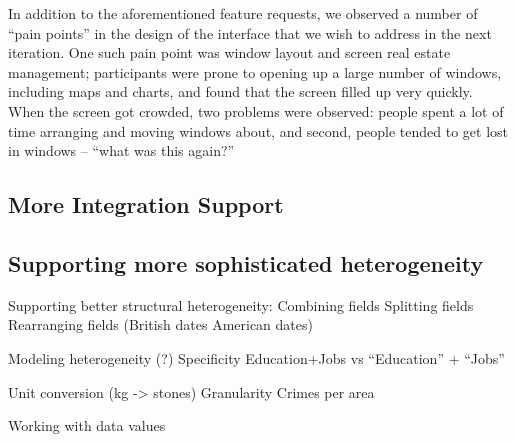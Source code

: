 \documentclass{sigchi}
\begin{document}
In addition to the aforementioned feature requests, we observed a number of ``pain points'' in the design of the interface that we wish to address in the next iteration.  One such pain point was window layout and screen real estate management; participants were prone to opening up a large number of windows, including maps and charts, and found that the screen filled up very quickly.  When the screen got crowded, two problems were observed: people spent a lot of time arranging and moving windows about, and second, people tended to get lost in windows -- ``what was this again?''

\subsection{More Integration Support}


\subsection{Supporting more sophisticated heterogeneity}

Supporting better structural heterogeneity:
   Combining fields
   Splitting fields
   Rearranging fields (British dates American dates)
   
Modeling heterogeneity (?)
   Specificity  
     Education+Jobs vs ``Education'' + ``Jobs'' 

   Unit conversion (kg -> stones)
   Granularity
     Crimes per area

Working with data values

\end{document}

